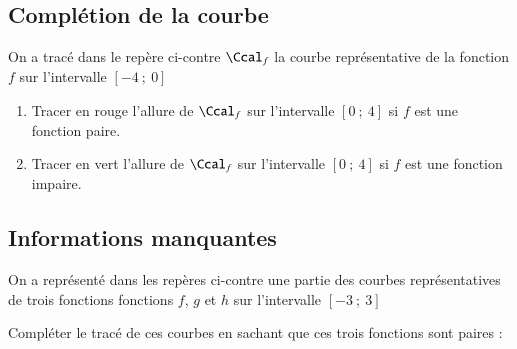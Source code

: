 \documentclass[oneside,12pt]{article}          			%
\begin{document}
\subsection{Complétion de la courbe}
\begin{minipage}{0.35\linewidth}
\end{minipage} \hspace{5mm}
\begin{minipage}{0.6\linewidth}
	On a tracé dans le repère ci-contre $\Ccal_f$ la courbe représentative de la fonction $f$ sur l'intervalle $[-4~;~0]$
	\begin{enumerate}
		\item Tracer en rouge l'allure de $\Ccal_f$ sur l'intervalle $[0~;~4]$ si $f$ est une fonction paire.
		\item Tracer en vert l'allure de $\Ccal_f$ sur l'intervalle $[0~;~4]$ si $f$ est une fonction impaire.
	\end{enumerate}
\end{minipage}



\subsection{Informations manquantes}
On a représenté dans les repères ci-contre une partie des courbes représentatives de trois fonctions fonctions $f$, $g$ et $h$ sur l'intervalle $[-3~;~3]$

Compléter le tracé de ces courbes en sachant que ces trois fonctions sont paires :
\end{document}
